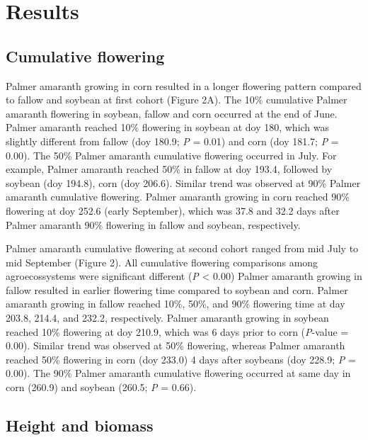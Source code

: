 \documentclass[utf8]{frontiersSCNS}
\begin{document}
\hypertarget{results}{%
\section*{Results}\label{results}}

\hypertarget{cumulative-flowering}{%
\subsection*{Cumulative flowering}\label{cumulative-flowering}}

Palmer amaranth growing in corn resulted in a longer flowering pattern
compared to fallow and soybean at first cohort (Figure 2A). The 10\%
cumulative Palmer amaranth flowering in soybean, fallow and corn
occurred at the end of June. Palmer amaranth reached 10\% flowering in
soybean at doy 180, which was slightly different from fallow (doy 180.9;
\emph{P} = 0.01) and corn (doy 181.7; \emph{P} = 0.00). The 50\% Palmer
amaranth cumulative flowering occurred in July. For example, Palmer
amaranth reached 50\% in fallow at doy 193.4, followed by soybean (doy
194.8), corn (doy 206.6). Similar trend was observed at 90\% Palmer
amaranth cumulative flowering. Palmer amaranth growing in corn reached
90\% flowering at doy 252.6 (early September), which was 37.8 and 32.2
days after Palmer amaranth 90\% flowering in fallow and soybean,
respectively.

Palmer amaranth cumulative flowering at second cohort ranged from mid
July to mid September (Figure 2). All cumulative flowering comparisons
among agroecossystems were significant different (\emph{P} \textless{}
0.00) Palmer amaranth growing in fallow resulted in earlier flowering
time compared to soybean and corn. Palmer amaranth growing in fallow
reached 10\%, 50\%, and 90\% flowering time at day 203.8, 214.4, and
232.2, respectively. Palmer amaranth growing in soybean reached 10\%
flowering at doy 210.9, which was 6 days prior to corn (\emph{P}-value =
0.00). Similar trend was observed at 50\% flowering, whereas Palmer
amaranth reached 50\% flowering in corn (doy 233.0) 4 days after
soybeans (doy 228.9; \emph{P} = 0.00). The 90\% Palmer amaranth
cumulative flowering occurred at same day in corn (260.9) and soybean
(260.5; \emph{P} = 0.66).

\hypertarget{height-and-biomass}{%
\subsection*{Height and biomass}\label{height-and-biomass}}
\end{document}
